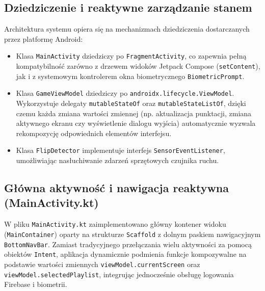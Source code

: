 \subsection{Dziedziczenie i reaktywne zarządzanie stanem}

\hspace{0.60cm}Architektura systemu opiera się na mechanizmach dziedziczenia dostarczanych przez platformę Android:
\begin{itemize}
    \item Klasa \texttt{MainActivity} dziedziczy po \texttt{FragmentActivity}, co zapewnia pełną kompatybilność zarówno z drzewem widoków Jetpack Compose (\texttt{setContent}), jak i z systemowym kontrolerem okna biometrycznego \texttt{BiometricPrompt}.
    \item Klasa \texttt{GameViewModel} dziedziczy po \texttt{androidx.lifecycle.ViewModel}. Wykorzystuje delegaty \texttt{mutableStateOf} oraz \texttt{mutableStateListOf}, dzięki czemu każda zmiana wartości zmiennej (np. aktualizacja punktacji, zmiana aktywnego ekranu czy wyświetlenie dialogu wyjścia) automatycznie wyzwala rekompozycję odpowiednich elementów interfejsu.
    \item Klasa \texttt{FlipDetector} implementuje interfejs \texttt{SensorEventListener}, umożliwiając nasłuchiwanie zdarzeń sprzętowych czujnika ruchu.
\end{itemize}

\subsection{Główna aktywność i nawigacja reaktywna (MainActivity.kt)}

\hspace{0.60cm}W pliku \texttt{MainActivity.kt} zaimplementowano główny kontener widoku (\texttt{MainContainer}) oparty na strukturze \texttt{Scaffold} z dolnym paskiem nawigacyjnym \texttt{BottomNavBar}. Zamiast tradycyjnego przełączania wielu aktywności za pomocą obiektów \texttt{Intent}, aplikacja dynamicznie podmienia funkcje kompozywalne na podstawie wartości zmiennych \texttt{viewModel.currentScreen} oraz \texttt{viewModel.selectedPlaylist}, integrując jednocześnie obsługę logowania Firebase i biometrii.

